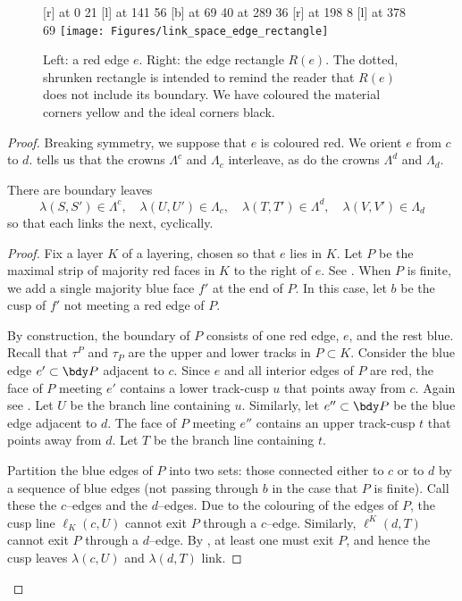 \documentclass[12pt]{amsart}
\begin{document}
\begin{figure}[htb]
\centering
{}
\small\hair 2pt
 [r] at 0 21
 [l] at 141 56
 [b] at 69 40
 at 289 36
 [r] at 198 8
 [l] at 378 69
\endlabellist
\texttt{[image: Figures/link\_space\_edge\_rectangle]}
\caption{Left: a red edge $e$.  Right: the edge rectangle $R(e)$.  The dotted, shrunken rectangle is intended to remind the reader that $R(e)$ does not include its boundary.  We have coloured the material corners yellow and the ideal corners black.}
\label{Fig:LinkSpaceEdge}
\end{figure}

\begin{proof}
Breaking symmetry, we suppose that $e$ is coloured red.  We orient $e$ from $c$ to $d$.    tells us that the crowns $\Lambda^c$ and $\Lambda_c$ interleave, as do the crowns $\Lambda^d$ and $\Lambda_d$.  

\begin{claim*}
There are boundary leaves 
\[
\lambda(S, S') \in \Lambda^c, \quad
\lambda(U, U') \in \Lambda_c, \quad
\lambda(T, T') \in \Lambda^d, \quad
\lambda(V, V') \in \Lambda_d
\]
so that each links the next, cyclically. 
\end{claim*}

\begin{proof}
Fix a layer $K$ of a layering, chosen so that $e$ lies in $K$.   Let $P$ be the maximal strip of majority red faces in $K$ to the right of $e$. See . When $P$ is finite, we add a single majority blue face $f'$ at the end of $P$.  In this case, let $b$ be the cusp of $f'$ not meeting a red edge of $P$.

By construction, the boundary of $P$ consists of one red edge, $e$, and the rest blue.  Recall that $\tau^P$ and $\tau_P$ are the upper and lower tracks in $P \subset K$.  Consider the blue edge $e' \subset \bdy P$ adjacent to $c$.  Since $e$ and all interior edges of $P$ are red, the face of $P$ meeting $e'$ contains a lower track-cusp $u$ that points away from $c$.  Again see .  Let $U$ be the branch line containing $u$.  
Similarly, let $e'' \subset \bdy P$ be the blue edge adjacent to $d$. The face of $P$ meeting $e''$ contains an upper track-cusp $t$ that points away from $d$. Let $T$ be the branch line containing $t$. 

Partition the blue edges of $P$ into two sets: those connected either to $c$ or to $d$ by a sequence of blue edges (not passing through $b$ in the case that $P$ is finite). Call these the $c$--edges and the $d$--edges.
Due to the colouring of the edges of $P$, the cusp line $\ell_K(c, U)$ cannot exit $P$ through a $c$--edge. Similarly, $\ell^K(d, T)$ cannot exit $P$ through a $d$--edge. By , at least one must exit $P$, and hence the cusp leaves $\lambda(c, U)$ and $\lambda(d, T)$ link.


\end{proof}
\end{proof}
\end{document}
